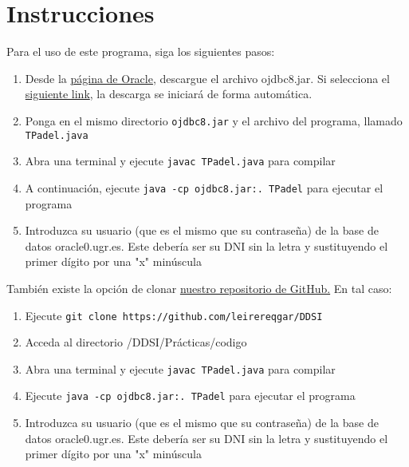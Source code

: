 \chapter{Instrucciones}\label{cap:instrucciones}
Para el uso de este programa, siga los siguientes pasos:
\begin{enumerate}
	\item Desde la \href{https://www.oracle.com/database/technologies/appdev/jdbc-ucp-19-7-c-downloads.html}{página de Oracle}, descargue el archivo ojdbc8.jar. Si selecciona el \href{https://download.oracle.com/otn-pub/otn_software/jdbc/197/ojdbc8.jar}{siguiente link}, la descarga se iniciará de forma automática.

	\item Ponga en el mismo directorio \texttt{ojdbc8.jar} y el archivo del programa, llamado \texttt{TPadel.java}
	\item Abra una terminal y ejecute \texttt{javac TPadel.java} para compilar
	\item A continuación, ejecute \texttt{java -cp ojdbc8.jar:. TPadel} para ejecutar el programa
	\item Introduzca su usuario (que es el mismo que su contraseña) de la base de datos oracle0.ugr.es. Este debería ser su DNI sin la letra y sustituyendo el primer dígito por una "x" minúscula
\end{enumerate}

También existe la opción de clonar \href{https://github.com/leirereqgar/DDSI}{nuestro repositorio de GitHub.} En tal caso:
\begin{enumerate}
	\item Ejecute \texttt{git clone https://github.com/leirereqgar/DDSI}
	\item Acceda al directorio /DDSI/Prácticas/codigo
	\item Abra una terminal y ejecute \texttt{javac TPadel.java} para compilar
	\item Ejecute \texttt{java -cp ojdbc8.jar:. TPadel} para ejecutar el programa
	\item Introduzca su usuario (que es el mismo que su contraseña) de la base de datos oracle0.ugr.es. Este debería ser su DNI sin la letra y sustituyendo el primer dígito por una "x" minúscula
\end{enumerate}
